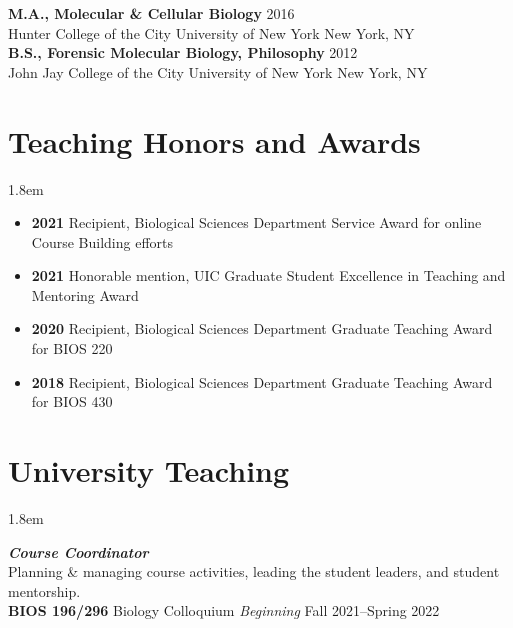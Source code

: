 \documentclass[]{article}
\begin{document}
\textbf{M.A., Molecular \& Cellular Biology} \hfill 2016\\ 
Hunter College of the City University of New York \hfill New York, NY\\
     

\textbf{B.S., Forensic Molecular Biology, Philosophy} \hfill 2012\\ 
John Jay College of the City University of New York \hfill New York, NY

\vspace{3mm}
\section{Teaching Honors and Awards}

\vspace{3mm}
\leftskip 1.8em

\begin{itemize}[label=$\mathwitch*$]
\item{\textbf{2021} Recipient, Biological Sciences Department Service Award for online Course Building efforts}
\item{\textbf{2021} Honorable mention, UIC Graduate Student Excellence in Teaching and Mentoring Award}
\item{\textbf{2020} Recipient, Biological Sciences Department Graduate Teaching Award for BIOS 220}
\item{\textbf{2018} Recipient, Biological Sciences Department Graduate Teaching Award for BIOS 430}
\end{itemize}

\vspace{2mm}
\section{University Teaching}

\vspace{3mm}
\leftskip 1.8em

\textit{\textbf{Course Coordinator}}\\
Planning \& managing course activities, leading the student leaders, and student mentorship.\\

\textbf{BIOS 196/296} Biology Colloquium \href{https://www.uicbcq.org/}{\faLink} \hfill \textit{Beginning} Fall 2021--Spring 2022\\%
\end{document}
